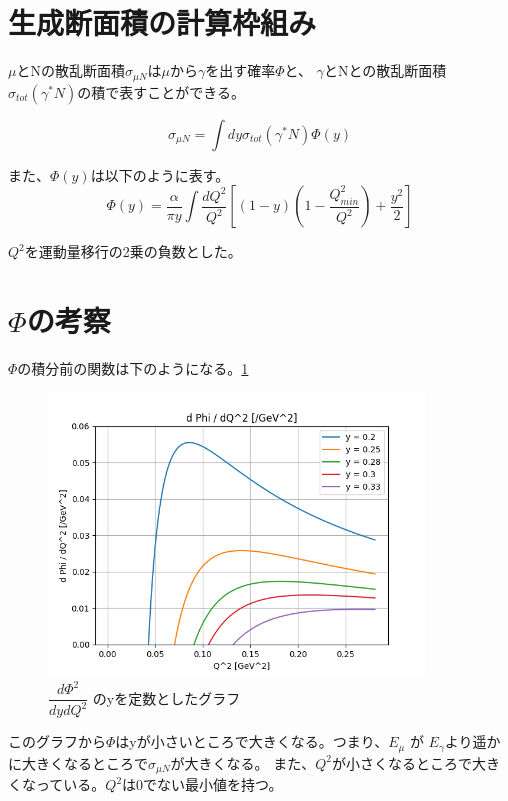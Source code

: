 \section{生成断面積の計算枠組み}
$\mu$とNの散乱断面積$\sigma_{\mu N}$は$\mu$から$\gamma$を出す確率$\Phi$と、
$\gamma$とNとの散乱断面積$\sigma_{tot}(\gamma^* N)$の積で表すことができる。

\begin{equation}
    \sigma_{\mu N} =\int dy  \sigma_{tot}(\gamma^* N) \Phi(y)
\end{equation}

また、$\Phi(y)$は以下のように表す。
\begin{equation}
    \Phi(y) = \dfrac{\alpha}{\pi y} \int \dfrac{dQ^2}{Q^2} [(1-y)(1 - \dfrac{Q^2_{min}}{Q^2}) + \dfrac{y^2}{2}]
\end{equation}

$Q^2$を運動量移行の2乗の負数とした。


\section{\texorpdfstring{$\Phi$}{LG}の考察}
$\Phi$の積分前の関数は下のようになる。\ref{fig:test4}
\begin{figure}[H]
    \centering
    \includegraphics[width=10cm]{img/flux_fixed_y.png}
    \caption{$\dfrac{d\Phi ^2}{dydQ^2}$ のyを定数としたグラフ}
    \label{fig:test4}
\end{figure}

このグラフから$\Phi$はyが小さいところで大きくなる。つまり、$E_\mu$ が $E_\gamma$より遥かに大きくなるところで$\sigma_{\mu N}$が大きくなる。
また、$Q^2$が小さくなるところで大きくなっている。$Q^2$は0でない最小値を持つ。


